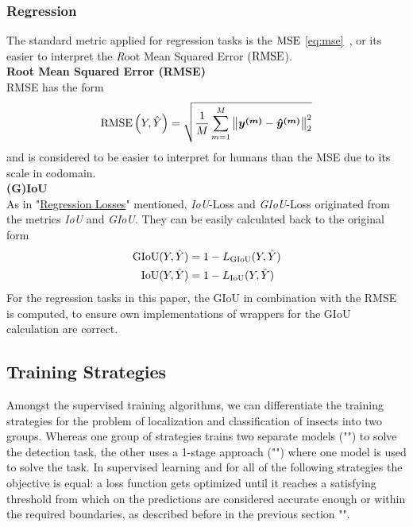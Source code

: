 \subsubsection{Regression}\label{subsubsec:regression-metrics}
The standard metric applied for regression tasks is the $\text{MSE}$ \eqref{eq:mse}~\cite{handsOn}, or its easier to interpret the \textit{R}oot Mean Squared Error ($\text{RMSE}$).\\
\textbf{Root Mean Squared Error (RMSE)}\\
RMSE has the form
\begin{align}
    \text{RMSE}\left(Y, \hat{Y}\right) =
    \sqrt{\frac{1}{M}\sum \limits_{m=1}^{M}\left\lVert\bm{y^{(m)}} - \bm{\hat{y}^{(m)}}\right\rVert_2^2}
    \label{eq:rmse}
\end{align}
and is considered to be easier to interpret for humans than the MSE due to its scale in codomain.\\
\textbf{(G)IoU}\\
As in "\hyperref[subsubsec:regression-loss]{Regression Losses}" mentioned, \textit{IoU}-Loss and \textit{GIoU}-Loss originated from the metrics \textit{IoU} and \textit{GIoU}.
They can be easily calculated back to the original form
\begin{align}
    \text{GIoU}(Y, \hat{Y}) &= 1 - L_{\text{GIoU}}(Y, \hat{Y})\\
    \text{IoU}(Y, \hat{Y}) &= 1 - L_{\text{IoU}}(Y, \hat{Y})
\end{align}
For the regression tasks in this paper, the GIoU in combination with the RMSE is computed, to ensure own implementations of wrappers for the GIoU calculation are correct.
\subsection{Training Strategies}\label{subsec:training-strategies}
Amongst the supervised training algorithms, we can differentiate the training strategies for the problem of localization and classification of insects into two groups. Whereas one group of strategies trains two separate models ("") to solve the detection task, the other uses a 1-stage approach ("") where one model is used to solve the task.
In supervised learning and for all of the following strategies the objective is equal: a loss function gets optimized until it reaches a satisfying threshold from which on the predictions are considered accurate enough or within the required boundaries, as described before in the previous section "".

